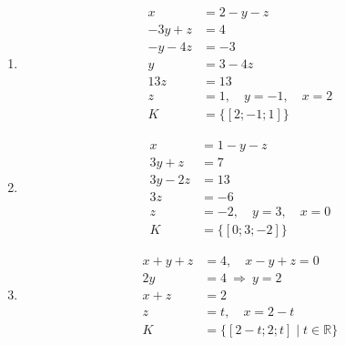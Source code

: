 \documentclass[11pt,a4paper]{article}
\begin{document}
\begin{zadaniReseniBox}[title={Domácí úkol}]
\begin{enumerate}[label=\alph*)]
\item
\[\begin{aligned}
x&=2-y-z\\-3y+z&=4\\-y-4z&=-3\\y&=3-4z\\13z&=13\\z&=1,\quad y=-1,\quad x=2\\K&=\{[2;-1;1]\}
\end{aligned}\]

\item
\[\begin{aligned}
x&=1-y-z\\3y+z&=7\\3y-2z&=13\\3z&=-6\\z&=-2,\quad y=3,\quad x=0\\K&=\{[0;3;-2]\}
\end{aligned}\]

\item
\[\begin{aligned}
x+y+z&=4,\quad x-y+z=0\\2y&=4\ \Rightarrow\ y=2\\x+z&=2\\z&=t,\quad x=2-t\\K&=\{[2-t;2;t]\mid t\in\mathbb R\}
\end{aligned}\]
\end{enumerate}
\end{zadaniReseniBox}


\end{document}
